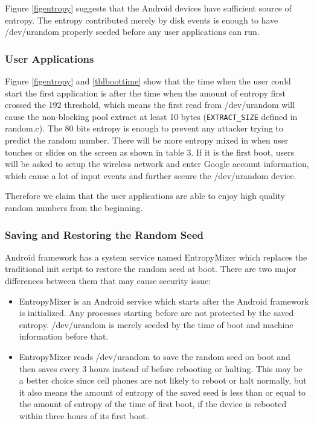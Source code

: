 Figure \ref{figentropy} suggests that the Android devices have sufficient source of entropy. The entropy contributed merely by disk events is enough to have /dev/urandom properly seeded before any user applications can run.


\subsubsection{User Applications}

Figure \ref{figentropy} and \ref{tblboottime} show that the time when the user could start the first application is after the time when the amount of entropy first crossed the 192 threshold, which means the first read from /dev/urandom will cause the non-blocking pool extract at least 10 bytes (\verb|EXTRACT_SIZE| defined in random.c). The 80 bits entropy is enough to prevent any attacker trying to predict the random number. There will be more entropy mixed in when user touches or slides on the screen as shown in table 3. If it is the first boot, users will be asked to setup the wireless network and enter Google account information, which cause a lot of input events and further secure the /dev/urandom device. 

Therefore we claim that the user applications are able to enjoy high quality random numbers from the beginning.

\subsubsection{Saving and Restoring the Random Seed}

Android framework has a system service named EntropyMixer which replaces the traditional init script to restore the random seed at boot. There are two major differences between them that may cause security issue:

\begin{itemize}

\item EntropyMixer is an Android service which starts after the Android framework is initialized. Any processes starting before are not protected by the saved entropy. /dev/urandom is merely seeded by the time of boot and machine information before that.

\item EntropyMixer reads /dev/urandom to save the random seed on boot and then saves every 3 hours instead of before rebooting or halting. This may be a better choice since cell phones are not likely to reboot or halt normally, but it also means the amount of entropy of the saved seed is less than or equal to the amount of entropy of the time of first boot, if the device is rebooted within three hours of its first boot. 

\end{itemize}

